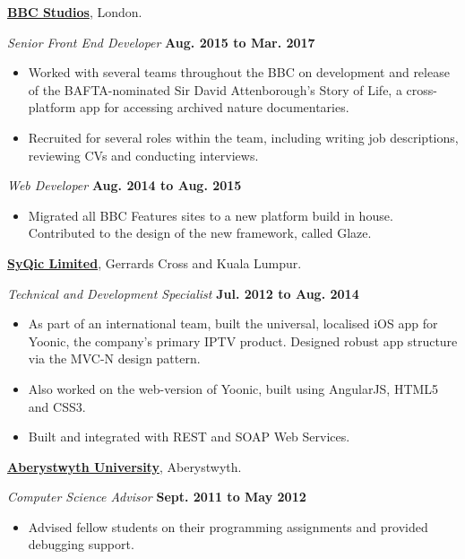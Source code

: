 \documentclass[11pt]{article}
\newenvironment{innerlist}[1][\enskip\textbullet]%
        {\begin{itemize}[#1,leftmargin=*,parsep=0pt,itemsep=0pt,topsep=0pt,partopsep=0pt]}
        {\end{itemize}}
\newcommand{\halfblankline}{\quad\vspace{-0.5\baselineskip}\pagebreak[3]}
\begin{document}
\halfblankline

\href{https://www.bbcstudios.com}{\textbf{BBC Studios}},
London.

\halfblankline

\textit{Senior Front End Developer}%
        \hfill \textbf{Aug. 2015 to Mar. 2017}
\begin{innerlist}
\item Worked with several teams throughout the BBC on development and release of the BAFTA-nominated Sir David Attenborough's Story of Life, a cross-platform app for accessing archived nature documentaries.
\item Recruited for several roles within the team, including writing job descriptions, reviewing CVs and conducting interviews.
\end{innerlist}

\halfblankline

\textit{Web Developer}%
        \hfill \textbf{Aug. 2014 to Aug. 2015}
\begin{innerlist}
\item Migrated all BBC Features sites to a new platform build in house. Contributed to the design of the new framework, called Glaze.
\end{innerlist}

\halfblankline

\href{http://www.syqic.com}{\textbf{SyQic Limited}},
Gerrards Cross and Kuala Lumpur.

\halfblankline

\textit{Technical and Development Specialist}%
        \hfill \textbf{Jul. 2012 to Aug. 2014}
\begin{innerlist}
\item As part of an international team, built the universal, localised iOS app for Yoonic, the company's primary IPTV product. Designed robust app structure via the MVC-N design pattern.
\item Also worked on the web-version of Yoonic, built using AngularJS, HTML5 and CSS3.
\item Built and integrated with REST and SOAP Web Services.
\end{innerlist}

\halfblankline

\href{http://www.aber.ac.uk}{\textbf{Aberystwyth University}},
Aberystwyth.

\halfblankline

\textit{Computer Science Advisor}%
        \hfill \textbf{Sept. 2011 to May 2012}
\begin{innerlist}
\item Advised fellow students on their programming assignments and provided debugging support.
\end{innerlist}
\end{document}
